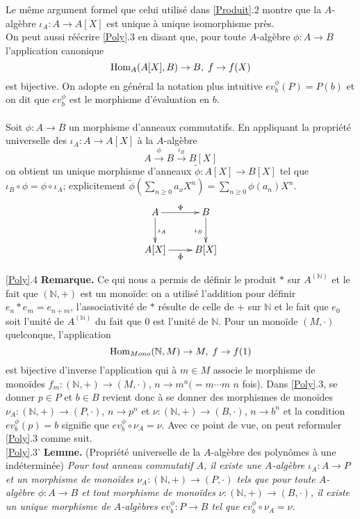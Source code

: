\documentclass[a4paper, oneside, 12pt]{book}
\theoremstyle{definition} %
\newcommand{\N}{\mathbb{N}}
\begin{document}
  Le même argument  formel que celui utilisé dans \ref{Produit}.2 montre que la $A$-algèbre $\iota_A:A\rightarrow A[X]$ est unique à unique isomorphisme  près.\\
 
  On peut aussi réécrire \ref{Poly}.3 en disant que, pour toute $A$-algèbre $\phi:A\rightarrow B$  l'application canonique
$$\hbox{\rm Hom}_A(A[X],B)\rightarrow B,\; f\rightarrow f(X)$$
 est bijective. On adopte  en général la notation plus intuitive $ev_{b}^\phi(P)=P( b)$ et on dit que $ev_{b}^\phi$ est le morphisme d'évaluation en $b$.\\
\\
 Soit $\phi:A  \rightarrow B $ un morphisme  d'anneaux commutatifs. En appliquant la propriété universelle des $\iota_A:A\rightarrow A[X]$  à la $A$-algèbre
$$A\stackrel{\phi}{\rightarrow} B\stackrel{\iota_B}{\rightarrow}B[X]$$
on obtient un unique morphisme d'anneaux  $\tilde{\phi}:A[X]\rightarrow B[X]$ tel que $\iota_B\circ \phi=\phi\circ \iota_A$; explicitement $\tilde{\phi}(\sum_{n\geq 0}a_xX^n)=\sum_{n\geq 0}\phi(a_n)X^n$.\\ 

	$$ \xymatrix{ A\ar[r]^\Phi \ar[d]^{\iota_A} & B \ar[d]_{\iota_B} \\ A[X]\ar[r]_{\tilde{\Phi}} & B[X] } $$
 
 
   \ref{Poly}.4 \textbf{Remarque.} Ce qui nous a permis de définir le produit $*$ sur $A^{(\N)}$ et le fait que $(\N,+)$ est un monoïde: on a utilisé l'addition pour définir $e_n*e_m=e_{n+m}$, l'associativité de $*$ résulte de celle de $+$ sur $\N$ et le fait que $e_0$ soit l'unité de $A^{(\N)}$ du fait que $0$ est l'unité de $\N$.  Pour un monoïde $(M,\cdot)$ quelconque, l'application
 $$\hbox{\rm Hom}_{Mono}(\N,M)\rightarrow M,\; f\rightarrow f(1)$$
 est bijective d'inverse l'application qui à $m\in M$ associe le morphisme de monoïdes $f_m:(\N,+)\rightarrow (M,\cdot)$, $n\rightarrow m^n(=m\cdots m$ $n$ fois). Dans \ref{Poly}.3, se donner $p\in P$ et $b\in B$ revient donc à se donner des morphismes de monoïdes $\nu_A:(\N,+)\rightarrow (P,\cdot)$, $n\rightarrow p^n$ et $\nu:(\N,+)\rightarrow (B,\cdot)$, $n\rightarrow b^n$ et la condition $ev^\phi_b(p)=b$ signifie que $ev^\phi_b\circ \nu_A=\nu$. Avec ce point de vue, on peut reformuler \ref{Poly}.3 comme suit. \\
 
  \ref{Poly}.3' \textbf{Lemme.} (Propriété universelle de la $A$-algèbre des polynômes à une indéterminée) \textit{Pour tout anneau commutatif $A$, il existe une $A$-algèbre $\iota_A: A\rightarrow P$ et un morphisme de monoïdes $\nu_A:(\N,+)\rightarrow (P,\cdot)$ tels que pour toute $A$-algèbre $\phi: A\rightarrow B$ et tout morphisme de monoïdes $\nu:(\N,+)\rightarrow (B,\cdot)$, il existe un unique  morphisme de $A$-algèbres $ev^\phi_b:P\rightarrow B$  tel que $ ev^\phi_b\circ \nu_A=\nu$. }\\
\end{document}
